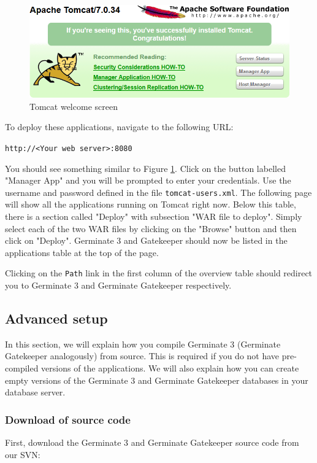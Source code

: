 \begin{figure}
	\centering
	\includegraphics[scale=0.5]{img/setup/tomcat.png}
	\caption{Tomcat welcome screen}
	\label{fig:tomcat}
\end{figure}
\noindent
To deploy these applications, navigate to the following URL:
\begin{center}
	\texttt{http://<Your web server>:8080}
\end{center}
You should see something similar to Figure \ref{fig:tomcat}. Click on the button labelled "Manager App" and you will be prompted to enter your credentials. Use the username and password defined in the file \texttt{tomcat-users.xml}. The following page will show all the applications running on Tomcat right now. Below this table, there is a section called "Deploy" with subsection "WAR file to deploy". Simply select each of the two WAR files by clicking on the "Browse" button and then click on "Deploy". Germinate 3 and Gatekeeper should now be listed in the applications table at the top of the page.

Clicking on the \texttt{Path} link in the first column of the overview table should redirect you to Germinate 3 and Germinate Gatekeeper respectively.

\subsection{Advanced setup}
In this section, we will explain how you compile Germinate 3 (Germinate Gatekeeper analogously) from source. This is required if you do not have pre-compiled versions of the applications. We will also explain how you can create empty versions of the Germinate 3 and Germinate Gatekeeper databases in your database server.

\subsubsection{Download of source code}

First, download the Germinate 3 and Germinate Gatekeeper source code from our SVN:

